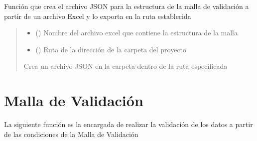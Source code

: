 \documentclass[letterpaper,10pt,spanish]{sphinxmanual}
\begin{document}
\begin{fulllineitems}
\label{\detokenize{index:malla_functions.create_json_malla}}
\pysigstartsignatures
{}
\pysigstopsignatures
\sphinxAtStartPar
Función que crea el archivo JSON para la estructura de la malla de validación a partir de un archivo Excel y lo exporta en la ruta establecida
\begin{quote}\begin{description}
\begin{itemize}
\item {} 
\sphinxAtStartPar
{} (\sphinxstyleliteralemphasis{\sphinxupquote{\sphinxhyphen{}}}) \textendash{} Nombre del archivo excel que contiene la estructura de la malla

\item {} 
\sphinxAtStartPar
{} (\sphinxstyleliteralemphasis{\sphinxupquote{\sphinxhyphen{}}}) \textendash{} Ruta de la dirección de la carpeta del proyecto

\end{itemize}

\sphinxAtStartPar
Crea un archivo JSON en la carpeta  dentro de la ruta específicada

\end{description}\end{quote}

\end{fulllineitems}



\section{Malla de Validación}
\label{\detokenize{index:id1}}
\sphinxAtStartPar
La siguiente función es la encargada de realizar la validación de los datos a partir de las condiciones de la Malla de Validación
\end{document}
